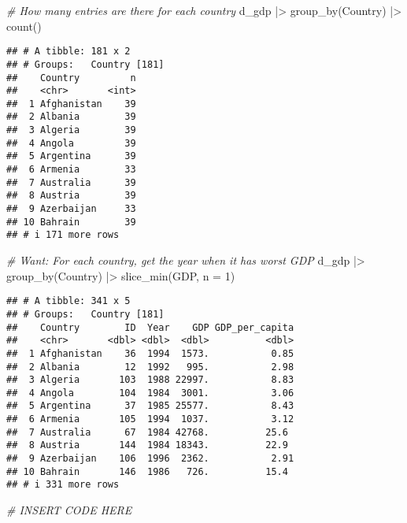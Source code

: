 \documentclass[
]{article}
\newenvironment{Shaded}{\begin{snugshade}}{\end{snugshade}}
\newcommand{\AttributeTok}[1]{\textcolor[rgb]{0.77,0.63,0.00}{#1}}
\newcommand{\CommentTok}[1]{\textcolor[rgb]{0.56,0.35,0.01}{\textit{#1}}}
\newcommand{\DecValTok}[1]{\textcolor[rgb]{0.00,0.00,0.81}{#1}}
\newcommand{\FunctionTok}[1]{\textcolor[rgb]{0.00,0.00,0.00}{#1}}
\newcommand{\NormalTok}[1]{#1}
\newcommand{\SpecialCharTok}[1]{\textcolor[rgb]{0.00,0.00,0.00}{#1}}
\begin{document}
\begin{Shaded}
\begin{Highlighting}[]
\CommentTok{\# How many entries are there for each country}
\NormalTok{d\_gdp }\SpecialCharTok{|\textgreater{}}
  \FunctionTok{group\_by}\NormalTok{(Country) }\SpecialCharTok{|\textgreater{}}
  \FunctionTok{count}\NormalTok{()}
\end{Highlighting}
\end{Shaded}

\begin{verbatim}
## # A tibble: 181 x 2
## # Groups:   Country [181]
##    Country         n
##    <chr>       <int>
##  1 Afghanistan    39
##  2 Albania        39
##  3 Algeria        39
##  4 Angola         39
##  5 Argentina      39
##  6 Armenia        33
##  7 Australia      39
##  8 Austria        39
##  9 Azerbaijan     33
## 10 Bahrain        39
## # i 171 more rows
\end{verbatim}

\begin{Shaded}
\begin{Highlighting}[]
\CommentTok{\# Want: For each country, get the year when it has worst GDP}
\NormalTok{d\_gdp }\SpecialCharTok{|\textgreater{}}
  \FunctionTok{group\_by}\NormalTok{(Country) }\SpecialCharTok{|\textgreater{}}
  \FunctionTok{slice\_min}\NormalTok{(GDP, }\AttributeTok{n =} \DecValTok{1}\NormalTok{)}
\end{Highlighting}
\end{Shaded}

\begin{verbatim}
## # A tibble: 341 x 5
## # Groups:   Country [181]
##    Country        ID  Year    GDP GDP_per_capita
##    <chr>       <dbl> <dbl>  <dbl>          <dbl>
##  1 Afghanistan    36  1994  1573.           0.85
##  2 Albania        12  1992   995.           2.98
##  3 Algeria       103  1988 22997.           8.83
##  4 Angola        104  1984  3001.           3.06
##  5 Argentina      37  1985 25577.           8.43
##  6 Armenia       105  1994  1037.           3.12
##  7 Australia      67  1984 42768.          25.6 
##  8 Austria       144  1984 18343.          22.9 
##  9 Azerbaijan    106  1996  2362.           2.91
## 10 Bahrain       146  1986   726.          15.4 
## # i 331 more rows
\end{verbatim}

\begin{Shaded}
\begin{Highlighting}[]
\CommentTok{\# INSERT CODE HERE}
\end{Highlighting}
\end{Shaded}
\end{document}
